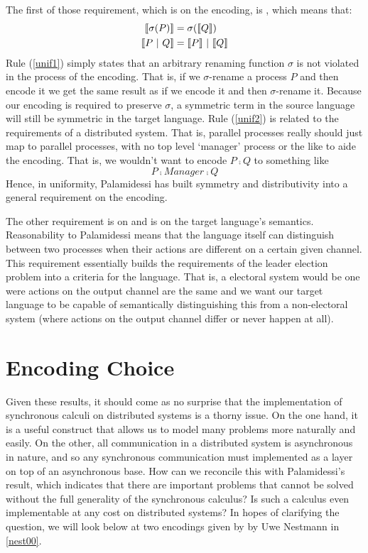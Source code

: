 The first of those requirement, which is on the encoding, is , which means that:
\begin{align}
	\llbracket{\sigma(P)}\rrbracket &= \sigma(\llbracket{Q}\rrbracket)\label{unif1}\\
	\llbracket{P \ensuremath{\ |\ } Q}\rrbracket &= \llbracket{P}\rrbracket \ |\  \llbracket{Q}\rrbracket\label{unif2}
\end{align}
Rule (\ref{unif1}) simply states that an arbitrary renaming function $\sigma$ is not violated in the process of the encoding.  
That is, if we $\sigma$-rename a process $P$ and then encode it we get the same result as if we encode it and then $\sigma$-rename it.  
Because our encoding is required to preserve $\sigma$, a symmetric term in the source language will still be symmetric in the target language.
Rule (\ref{unif2}) is related to the requirements of a distributed system.  
That is, parallel processes really should just map to parallel processes, with no top level `manager' process or the like to aide the encoding.  
That is, we wouldn't want to encode $P \comp Q$ to something like 
\[
	P \comp Manager \comp Q
\]
Hence, in uniformity, Palamidessi has built symmetry and distributivity into a general requirement on the encoding.

The other requirement is on  and is on the target language's semantics.  
Reasonability to Palamidessi means that the language itself can distinguish between two processes when their actions are different on a certain given channel.  
This requirement essentially builds the requirements of the leader election problem into a criteria for the language.  
That is, a electoral system would be one were actions on the output channel are the same and we want our target language to be capable of semantically distinguishing this from a non-electoral system (where actions on the output channel differ or never happen at all).

\section{Encoding Choice}\label{failedencoding}
Given these results, it should come as no surprise that the implementation of synchronous calculi on distributed systems is a thorny issue.  
On the one hand, it is a useful construct that allows us to model many problems more naturally and easily.  
On the other, all communication in a distributed system is asynchronous in nature, and so any synchronous communication must implemented as a layer on top of an asynchronous base.  
How can we reconcile this with Palamidessi's result, which indicates that there are important problems that cannot be solved without the full generality of the synchronous calculus?  Is such a calculus even implementable at any cost on distributed systems?  In hopes of clarifying the question, we will look below at two encodings given by by Uwe Nestmann in \ref{nest00}.

